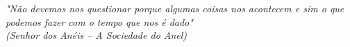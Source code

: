 \begin{epigrafe}
\vspace*{\fill}
\begin{flushright}
\emph{"Não devemos nos questionar porque algumas coisas nos acontecem e sim o que podemos fazer com o tempo que nos é dado" 
\\ (Senhor dos Anéis – A Sociedade do Anel)}
\end{flushright}
\end{epigrafe}